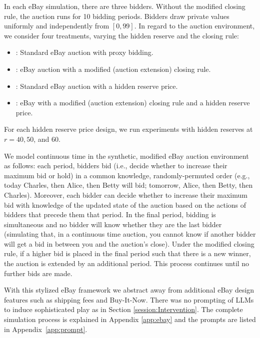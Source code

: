 \documentclass{article} %
\begin{document}
In each eBay simulation, there are three bidders. Without the modified closing rule, 
the auction runs for 10 bidding periods. Bidders draw private values uniformly and independently from $[0, 99]$. In regard to  the auction environment, we consider four treatments, varying the hidden reserve and the closing rule:
%
\begin{itemize}
    \item[T1]: Standard eBay auction with proxy bidding.
    \item[T2]: eBay auction with a modified (auction extension) closing rule.
    \item[T3]: Standard eBay auction with a hidden reserve price.
    \item[T4]: eBay with a modified (auction extension) closing rule and a hidden reserve price.
\end{itemize}

For each hidden reserve price design, we run
experiments with hidden reserves at $r = 40, 50$, and $60$.

We model continuous time in the synthetic, modified eBay auction environment
as follows: each period, bidders bid (i.e., decide whether to increase their maximum bid or  hold) in a common knowledge, randomly-permuted order (e.g., today Charles, then Alice, then Betty will bid; tomorrow, Alice, then Betty, then Charles). Moreover, each bidder can decide whether to increase their maximum bid with knowledge of the updated state of the auction based on the actions of bidders that precede them that period.
In the final period, 
bidding is simultaneous and
no bidder will know whether they are the last bidder (simulating that, in a continuous time auction, you cannot know if another bidder will get a bid in between you and the auction's close).
Under the modified closing rule, if a higher bid is placed in the final period such that there is a new winner, 
the auction is extended by an additional period. This process continues until no further bids are made.

With this stylized eBay framework we abstract away from additional eBay design features 
such as shipping fees and Buy-It-Now. There was no prompting of LLMs to induce sophisticated play as in Section \ref{session:Intervention}. The complete simulation process is explained in Appendix \ref{app:ebay} and the prompts are listed in Appendix~\ref{app:prompt}.

\end{document}
